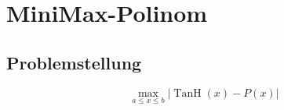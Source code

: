 %
%
%
\section{MiniMax-Polinom 
\label{transfer:section:teil2}}



\subsection{Problemstellung
\label{transfer:subsection:bonorum}}

\[
\max _{a \leq x \leq b}|\operatorname{TanH}(x)-P(x)|
\]

